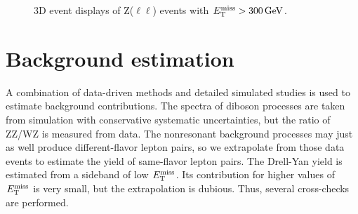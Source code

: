 \clearpage
\begin{figure}[!htb]
\centering
\setlength{\fboxsep}{0pt}
\setlength{\fboxrule}{1pt}
\vspace{1cm}

\vspace{1cm}

\caption{3D event displays of Z($\ell\ell$) events with $E_\mathrm{T}^{\mathrm{miss}} > 300 \,\text{Ge\hspace{-.08em}V}$.
\eventDisplayCaption
\label{fig:zllmet_eventdisplay}}
\end{figure}
\clearpage

\section{Background estimation}
\label{sec:dmbkg}
A combination of data-driven methods and detailed simulated studies is used to
estimate background contributions.
The spectra of diboson processes are taken from simulation with conservative systematic uncertainties, but the ratio of ZZ/WZ is measured from data.
The nonresonant background processes may just as well produce different-flavor lepton pairs, so we extrapolate from those data events to estimate the yield of same-flavor lepton pairs.
The Drell-Yan yield is estimated from a sideband of low $E_\mathrm{T}^{\mathrm{miss}}$. Its contribution for higher values of $E_\mathrm{T}^{\mathrm{miss}}$ is very small, but the extrapolation is dubious. Thus, several cross-checks are performed.


